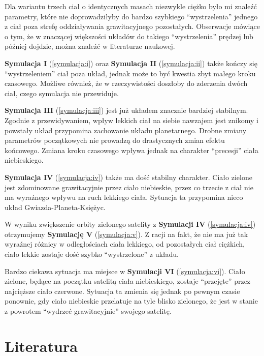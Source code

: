 \documentclass{article}
\newcommand{\br}{\vspace{1em}}
\begin{document}
Dla wariantu trzech ciał o identycznych masach niezwykle ciężko było mi znaleźć parametry, które nie doprowadziłyby do bardzo szybkiego \enquote{wystrzelenia} jednego z ciał poza strefę oddziaływania grawitacyjnego pozostałych. Obserwacje mówiące o tym, że w znaczącej większości układów do takiego \enquote{wystrzelenia} prędzej lub później dojdzie, można znaleźć w literaturze naukowej.\br

\textbf{Symulacja I} (\ref{symulacja:i}) oraz \textbf{Symulacja II} (\ref{symulacja:ii}) także kończy się \enquote{wystrzeleniem} ciał poza układ, jednak może to być kwestia zbyt małego kroku czasowego. Możliwe również, że w rzeczywistości doszłoby do zderzenia dwóch ciał, czego symulacja nie przewiduje.\br

\textbf{Symulacja III} (\ref{symulacja:iii}) jest już układem znacznie bardziej stabilnym. Zgodnie z przewidywaniem, wpływ lekkich ciał na siebie nawzajem jest znikomy i powstały układ przypomina zachowanie układu planetarnego. Drobne zmiany parametrów początkowych nie prowadzą do drastycznych zmian efektu końcowego. Zmiana kroku czasowego wpływa jednak na charakter \enquote{precesji} ciała niebieskiego.\br

\textbf{Symulacja IV} (\ref{symulacja:iv}) także ma dość stabilny charakter. Ciało zielone jest zdominowane grawitacyjnie przez ciało niebieskie, przez co trzecie z ciał nie ma wyraźnego wpływu na ruch lekkiego ciała. Sytuacja ta przypomina nieco układ Gwiazda-Planeta-Księżyc.\br

W wyniku zwiększenie orbity zielonego satelity z \textbf{Symulacji IV} (\ref{symulacja:iv}) otrzymujemy \textbf{Symulację V} (\ref{symulacja:v}). Z racji na fakt, że nie ma już tak wyraźnej różnicy w odległościach ciała lekkiego, od pozostałych ciał ciężkich, ciało lekkie zostaje dość szybko \enquote{wystrzelone} z układu.\br

Bardzo ciekawa sytuacja ma miejsce w \textbf{Symulacji VI} (\ref{symulacja:vi}). Ciało zielone, będące na początku satelitą ciała niebieskiego, zostaje \enquote{przejęte} przez najcięższe ciało czerwone. Sytuacja ta zmienia się jednak po pewnym czasie ponownie, gdy ciało niebieskie przelatuje na tyle blisko zielonego, że jest w stanie z powrotem \enquote{wydrzeć grawitacyjnie} swojego satelitę.\br

\section{Literatura}


\end{document}
